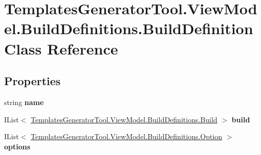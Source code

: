 \hypertarget{class_templates_generator_tool_1_1_view_model_1_1_build_definitions_1_1_build_definition}{}\section{Templates\+Generator\+Tool.\+View\+Model.\+Build\+Definitions.\+Build\+Definition Class Reference}
\label{class_templates_generator_tool_1_1_view_model_1_1_build_definitions_1_1_build_definition}
\subsection*{Properties}
\begin{DoxyCompactItemize}
\item 
\mbox{\label{class_templates_generator_tool_1_1_view_model_1_1_build_definitions_1_1_build_definition_ad0504177e756edaba26bf86b1abc08d6}} 
string {\bfseries name}
\item 
\mbox{\label{class_templates_generator_tool_1_1_view_model_1_1_build_definitions_1_1_build_definition_a4b2444460c936f09bbdb229f1c8390b8}} 
I\+List$<$ \mbox{\hyperlink{class_templates_generator_tool_1_1_view_model_1_1_build_definitions_1_1_build}{Templates\+Generator\+Tool.\+View\+Model.\+Build\+Definitions.\+Build}} $>$ {\bfseries build}
\item 
\mbox{\label{class_templates_generator_tool_1_1_view_model_1_1_build_definitions_1_1_build_definition_a6526edf5740b2dabb237d05f695fd713}} 
I\+List$<$ \mbox{\hyperlink{class_templates_generator_tool_1_1_view_model_1_1_build_definitions_1_1_option}{Templates\+Generator\+Tool.\+View\+Model.\+Build\+Definitions.\+Option}} $>$ {\bfseries options}
\item 

\end{DoxyCompactItemize}
